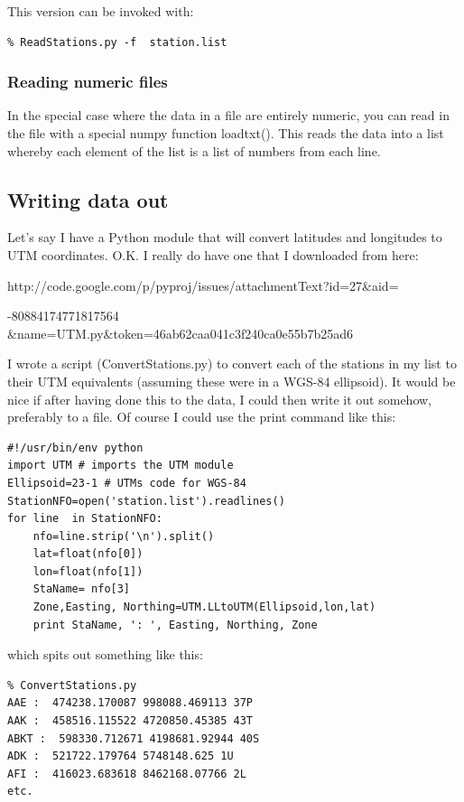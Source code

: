 \documentclass[11pt]{book}
\begin{document}
{\noindent This version can be invoked with:

{\color{blue}\begin{verbatim}
% ReadStations.py -f  station.list
\end{verbatim}}

\subsubsection{Reading numeric files}

In the special case where the data in a file are entirely numeric, you can read in the file with a special {\color{blue}numpy} function {\color{blue}loadtxt()}.  This reads the data into a list whereby each element of the list is a list of numbers from each line.
 
 \subsection{Writing data out}

Let's say I have a Python module that will convert latitudes and longitudes to UTM coordinates.  O.K. I really do have one that I downloaded from here:  

http://code.google.com/p/pyproj/issues/attachmentText?id=27\&aid=
   
   -80884174771817564 \&name=UTM.py\&token=46ab62caa041c3f240ca0e55b7b25ad6

\noindent I wrote a script ({\color{blue}ConvertStations.py}) to convert each of the stations in my list to their UTM equivalents (assuming these were in a WGS-84 ellipsoid).  It would be nice if  after having done this to the data, I could then write it out somehow, preferably to a file.  Of course I could use the {\color{blue}print} command like this:


 { \color{blue} \begin{verbatim}
#!/usr/bin/env python
import UTM # imports the UTM module
Ellipsoid=23-1 # UTMs code for WGS-84
StationNFO=open('station.list').readlines()
for line  in StationNFO:
    nfo=line.strip('\n').split()
    lat=float(nfo[0])
    lon=float(nfo[1])
    StaName= nfo[3]
    Zone,Easting, Northing=UTM.LLtoUTM(Ellipsoid,lon,lat)
    print StaName, ': ', Easting, Northing, Zone
 \end{verbatim}}

\noindent
which spits out something like this: 

{ \color{blue} \begin{verbatim}
% ConvertStations.py
AAE :  474238.170087 998088.469113 37P
AAK :  458516.115522 4720850.45385 43T
ABKT :  598330.712671 4198681.92944 40S
ADK :  521722.179764 5748148.625 1U
AFI :  416023.683618 8462168.07766 2L
etc.
\end{verbatim}}

}
\end{document}
